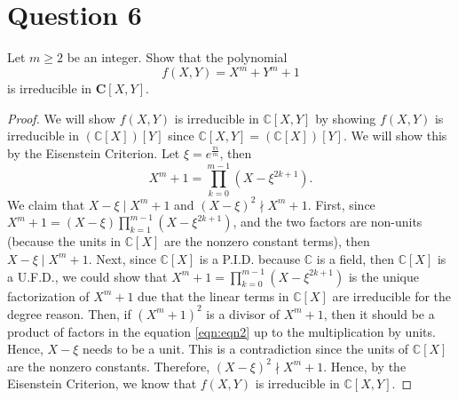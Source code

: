 \section{Question 6}

\begin{question}
    Let $m \geq 2$ be an integer. Show that the polynomial
    $$
    f(X, Y)=X^m+Y^m+1
    $$
    is irreducible in $\mathbf{C}[X, Y]$.
\end{question}

\begin{answer}
    \begin{proof}
        We will show $f(X,Y)$ is irreducible in $\mathbb{C}[X,Y]$ by showing $f(X,Y)$ is irreducible in $(\mathbb{C}[X])[Y]$ since $\mathbb{C}[X,Y] = (\mathbb{C}[X])[Y]$. We will show this by the Eisenstein Criterion. Let $\xi = e^{\frac{\pi i}{m}}$, then 
        \begin{equation}\label{eqn:eqn2}
            X^m + 1 = \prod_{k=0}^{m-1}(X - \xi^{2k+1}).
        \end{equation}
        We claim that $X - \xi \mid X^m + 1$ and $(X - \xi)^2 \nmid X^m + 1$. First, since $X^m + 1 = (X - \xi) \prod_{k = 1}^{m-1}(X-\xi^{2k+1})$, and the two factors are non-units (because the units in $\mathbb{C}[X]$ are the nonzero constant terms), then $X-\xi \mid X^m + 1$. Next, since $\mathbb{C}[X]$ is a P.I.D. because $\mathbb{C}$ is a field, then $\mathbb{C}[X]$ is a U.F.D., we could show that $X^m + 1 = \prod_{k=0}^{m-1}(X - \xi^{2k+1})$ is the unique factorization of $X^m + 1$ due that the linear terms in $\mathbb{C}[X]$ are irreducible for the degree reason. Then, if $(X^m + 1)^2$ is a divisor of $X^m + 1$, then it should be a product of factors in the equation \ref{eqn:eqn2} up to the multiplication by units. Hence, $X-\xi$ needs to be a unit. This is a contradiction since the units of $\mathbb{C}[X]$ are the nonzero constants. Therefore, $(X-\xi)^2 \nmid X^m + 1$. Hence, by the Eisenstein Criterion, we know that $f(X,Y)$ is irreducible in $\mathbb{C}[X,Y]$.
    \end{proof}
\end{answer}
